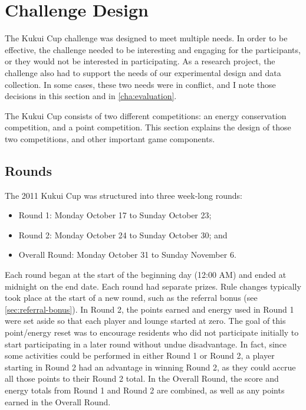 \section{Challenge Design}

The Kukui Cup challenge was designed to meet multiple needs. In order to be effective, the challenge needed to be interesting and engaging for the participants, or they would not be interested in participating. As a research project, the challenge also had to support the needs of our experimental design and data collection. In some cases, these two needs were in conflict, and I note those decisions in this section and in \autoref{cha:evaluation}.

The Kukui Cup consists of two different competitions: an energy conservation competition, and a point competition. This section explains the design of those two competitions, and other important game components.


\subsection{Rounds}

The 2011 Kukui Cup was structured into three week-long rounds:

\begin{itemize}
	\item Round 1: Monday October 17 to Sunday October 23;
	\item Round 2: Monday October 24 to Sunday October 30; and
	\item Overall Round: Monday October 31 to Sunday November 6.
\end{itemize}

Each round began at the start of the beginning day (12:00 AM) and ended at midnight on the end date. Each round had separate prizes. Rule changes typically took place at the start of a new round, such as the referral bonus (see \autoref{sec:referral-bonus}). In Round 2, the points earned and energy used in Round 1 were set aside so that each player and lounge started at zero. The goal of this point/energy reset was to encourage residents who did not participate initially to start participating in a later round without undue disadvantage. In fact, since some activities could be performed in either Round 1 or Round 2, a player starting in Round 2 had an advantage in winning Round 2, as they could accrue all those points to their Round 2 total. In the Overall Round, the score and energy totals from Round 1 and Round 2 are combined, as well as any points earned in the Overall Round.


